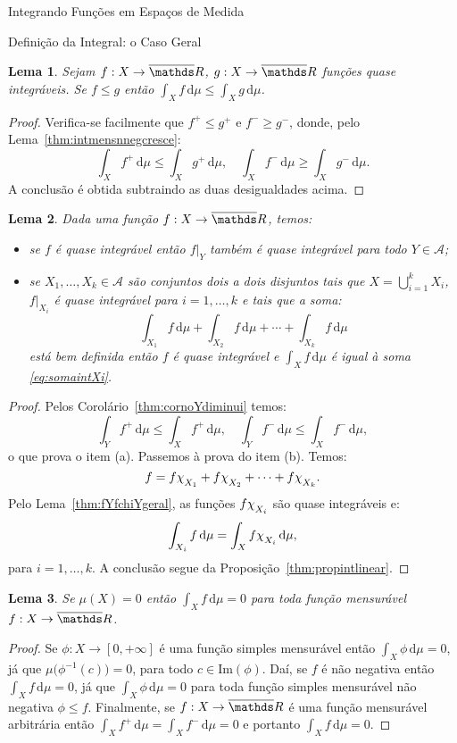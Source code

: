\documentclass[oneside,final,11pt]{amsbook}
\newcommand{\R}{\mathds R}
\newcommand{\Img}{\mathrm{Im}}
\newcommand{\dd}{\mathrm d}
\newcommand{\chilow}[1]{\chi_{\lower2pt\hbox{$\scriptstyle#1$}}}
\theoremstyle{remark}\newtheorem{exercise}{Exercício}[chapter]
\theoremstyle{remark}\newtheorem{*exercise}[exercise]{\hbox to 0pt{\hskip 0pt minus 1fil*}Exercício}
\theoremstyle{definition}\newtheorem{exdefin}{Definição}[chapter]
\theoremstyle{plain}\newtheorem{teo}{Teorema}[section]
\theoremstyle{plain}\newtheorem{lem}[teo]{Lema}
\theoremstyle{plain}\newtheorem{prop}[teo]{Proposição}
\theoremstyle{plain}\newtheorem{cor}[teo]{Corolário}
\theoremstyle{definition}\newtheorem{defin}[teo]{Definição}
\theoremstyle{remark}\newtheorem{rem}[teo]{Observação}
\theoremstyle{definition}\newtheorem{notation}[teo]{Notação}
\theoremstyle{definition}\newtheorem{convention}[teo]{Convenção}
\theoremstyle{definition}\newtheorem{example}[teo]{Exemplo}
\numberwithin{section}{chapter}
\numberwithin{equation}{section}
\begin{document}
\begin{chapter}{Integrando Funções em Espaços de Medida}
\begin{section}{Definição da Integral: o Caso Geral}
\begin{lem}
Sejam $f:X\to\overline\R$, $g:X\to\overline\R$ funções quase integráveis. Se $f\le g$
então $\int_Xf\,\dd\mu\le\int_Xg\,\dd\mu$.
\end{lem}
\begin{proof}
Verifica-se facilmente que $f^+\le g^+$ e $f^-\ge g^-$, donde, pelo Lema~\ref{thm:intmensnnegcresce}:
\[\int_Xf^+\,\dd\mu\le\int_Xg^+\,\dd\mu,\quad\int_Xf^-\,\dd\mu\ge\int_Xg^-\,\dd\mu.\]
A conclusão é obtida subtraindo as duas desigualdades acima.
\end{proof}

\begin{lem}\label{thm:pedacosXint}
Dada uma função $f:X\to\overline\R$, temos:
\begin{itemize}
\item[(a)] se $f$ é quase integrável então $f\vert_Y$ também é quase integrável
para todo $Y\in\mathcal A$;
\item[(b)] se $X_1,\ldots,X_k\in\mathcal A$ são conjuntos dois a dois disjuntos
tais que $X=\bigcup_{i=1}^kX_i$, $f\vert_{X_i}$ é quase integrável para $i=1,\ldots,k$
e tais que a soma:
\begin{equation}\label{eq:somaintXi}
\int_{X_1}f\,\dd\mu+\int_{X_2}f\,\dd\mu+\cdots+\int_{X_k}f\,\dd\mu
\end{equation}
está bem definida então $f$ é quase integrável e $\int_Xf\,\dd\mu$ é igual à soma \eqref{eq:somaintXi}.
\end{itemize}
\end{lem}
\begin{proof}
Pelos Corolário~\ref{thm:cornoYdiminui} temos:
\[\int_Yf^+\,\dd\mu\le\int_Xf^+\,\dd\mu,\quad
\int_Yf^-\,\dd\mu\le\int_Xf^-\,\dd\mu,\]
o que prova o item (a). Passemos à prova do item (b). Temos:
\[f=f\chilow{X_1}+f\chilow{X_2}+\cdots+f\chilow{X_k}.\]
Pelo Lema~\ref{thm:fYfchiYgeral}, as funções $f\chilow{X_i}$ são quase integráveis e:
\[\int_{X_i}f\,\dd\mu=\int_Xf\chilow{X_i}\,\dd\mu,\]
para $i=1,\ldots,k$. A conclusão segue da Proposição~\ref{thm:propintlinear}.
\end{proof}

\begin{lem}\label{thm:muXzero}
Se $\mu(X)=0$ então $\int_Xf\,\dd\mu=0$ para toda função mensurável $f:X\to\overline\R$.
\end{lem}
\begin{proof}
Se $\phi:X\to[0,+\infty]$ é uma função simples mensurável então $\int_X\phi\,\dd\mu=0$,
já que $\mu\big(\phi^{-1}(c)\big)=0$, para todo $c\in\Img(\phi)$. Daí, se $f$ é não negativa
então $\int_Xf\,\dd\mu=0$, já que $\int_X\phi\,\dd\mu=0$ para toda função simples mensurável
não negativa $\phi\le f$. Finalmente, se $f:X\to\overline\R$ é uma função mensurável arbitrária
então $\int_Xf^+\,\dd\mu=\int_Xf^-\,\dd\mu=0$ e portanto $\int_Xf\,\dd\mu=0$.
\end{proof}


\end{section}
\end{chapter}
\end{document}
